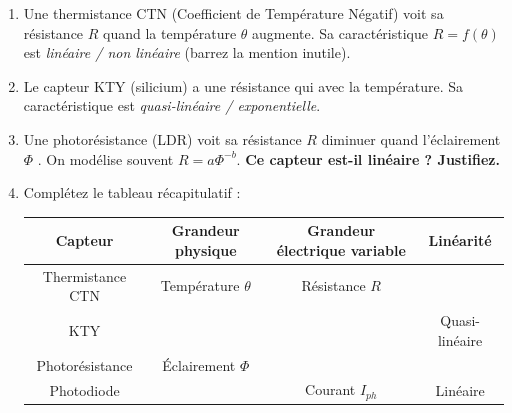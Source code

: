\documentclass[11pt]{article}
\begin{document}
\begin{exercice}
\begin{enumerate}
    \item Une thermistance CTN (Coefficient de Température Négatif) voit sa résistance $R$ \underline{\hspace{2cm}} quand la température $\theta$ augmente. Sa caractéristique $R = f(\theta)$ est \textit{linéaire / non linéaire} (barrez la mention inutile).
    \item Le capteur KTY (silicium) a une résistance qui \underline{\hspace{2cm}} avec la température. Sa caractéristique est \textit{quasi-linéaire / exponentielle}.
    \item Une photorésistance (LDR) voit sa résistance $R$ diminuer quand l'éclairement $\Phi$ \underline{\hspace{2cm}}. On modélise souvent $R = a \Phi^{-b}$. \textbf{Ce capteur est-il linéaire ? Justifiez.}
    \item Complétez le tableau récapitulatif :
    \begin{center}
    \begin{tabular}{|c|c|c|c|}
    \hline
    \textbf{Capteur} & \textbf{Grandeur physique} & \textbf{Grandeur électrique variable} & \textbf{Linéarité} \\ \hline
    Thermistance CTN & Température $\theta$ & Résistance $R$ &  \\ \hline
    KTY &  &  & Quasi-linéaire \\ \hline
    Photorésistance & Éclairement $\Phi$ &  &  \\ \hline
    Photodiode &  & Courant $I_{ph}$ & Linéaire \\ \hline
    \end{tabular}
    \end{center}
\end{enumerate}
\end{exercice}
\end{document}
